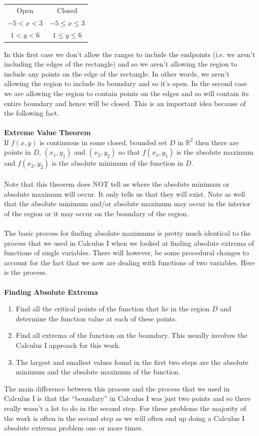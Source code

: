 \documentclass[10pt,reqno]{book}
\theoremstyle{definition}
\def\R{\mathbb{R}}
\begin{document}
	\begin{center}
		\begin{tabular}{cc}
			Open & Closed\\
			$ -5 < x < 3 $ & $ -5 \leq x \leq 3 $\\
			$ 1 < y < 6 $ & $ 1 \leq y \leq 6 $
		\end{tabular}
	\end{center}
	In this first case we don't allow the ranges to include the endpoints (i.e. we aren't including the edges of the rectangle) and so we aren't allowing the region to include any points on the edge of the rectangle. In other words, we aren't allowing the region to include its boundary and so it's open. In the second case we are allowing the region to contain points on the edges and so will contain its entire boundary and hence will be closed. This is an important idea because of the following fact.\\ \\
	\textbf{Extreme Value Theorem}\\
	If $ f(x,y) $ is continuous in some closed, bounded set $ D $ in $ \R^2 $ then there are points in $ D $, $ (x_1,y_1) $ and $ (x_2,y_2) $ so that $ f(x_1,y_1) $ is the absolute maximum and $ f(x_2,y_2) $ is the absolute minimum of the function in $ D $.\\ \\
	Note that this theorem does NOT tell us where the absolute minimum or absolute maximum will occur. It only tells us that they will exist. Note as well that the absolute minimum and/or absolute maximum may occur in the interior of the region or it may occur on the boundary of the region.\\ \\
	The basic process for finding absolute maximums is pretty much identical to the process that we used in Calculus I when we looked at finding absolute extrema of functions of single variables. There will however, be some procedural changes to account for the fact that we now are dealing with functions of two variables. Here is the process.\\ \\
	\textbf{Finding Absolute Extrema}
	\begin{enumerate}
		\item Find all the critical points of the function that lie in the region $ D $ and determine the function value at each of these points.
		\item Find all extrema of the function on the boundary. This usually involves the Calculus I approach for this work.
		\item The largest and smallest values found in the first two steps are the absolute minimum and the absolute maximum of the function.
	\end{enumerate}
	The main difference between this process and the process that we used in Calculus I is that the ``boundary'' in Calculus I was just two points and so there really wasn't a lot to do in the second step. For these problems the majority of the work is often in the second step as we will often end up doing a Calculus I absolute extrema problem one or more times.
	
\end{document}

